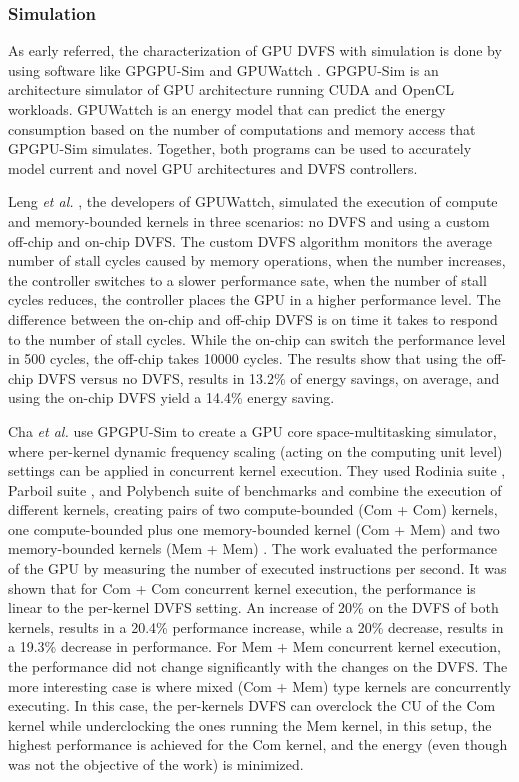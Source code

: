 \subsubsection{Simulation}

As early referred, the characterization of GPU DVFS with simulation is done by using software like GPGPU-Sim \cite{noauthor_gpgpu-sim/gpgpu-sim_distribution_2019} and GPUWattch \cite{noauthor_gpu_nodate} \cite{leng_gpuwattch:_2013}. GPGPU-Sim is an architecture simulator of GPU architecture running CUDA and OpenCL workloads. GPUWattch is an energy model that can predict the energy consumption based on the number of computations and memory access that GPGPU-Sim simulates. Together, both programs can be used to accurately model current and novel GPU architectures and DVFS controllers.

Leng \textit{et al.} \cite{leng_gpuwattch:_2013}, the developers of GPUWattch, simulated the execution of compute and memory-bounded kernels in three scenarios: no DVFS and using a custom off-chip and on-chip DVFS. The custom DVFS algorithm monitors the average number of stall cycles caused by memory operations, when the number increases, the controller switches to a slower performance sate, when the number of stall cycles reduces, the controller places the GPU in a higher performance level. The difference between the on-chip and off-chip DVFS is on time it takes to respond to the number of stall cycles. While the on-chip can switch the performance level in 500 cycles, the off-chip takes 10000 cycles. The results show that using the off-chip DVFS versus no DVFS, results in 13.2\% of energy savings, on average, and using the on-chip DVFS yield a 14.4\% energy saving.

Cha \textit{et al.} \cite{cha_core-level_2018} use GPGPU-Sim to create a GPU core space-multitasking simulator, where per-kernel dynamic frequency scaling (acting on the computing unit level) settings can be applied in concurrent kernel execution. They used Rodinia suite \cite{che_rodinia:_2009}, Parboil suite \cite{stratton_parboil:_nodate}, and Polybench suite \cite{noauthor_polybench/c_nodate} of benchmarks and combine the execution of different kernels, creating pairs of two compute-bounded (Com + Com) kernels, one compute-bounded plus one memory-bounded kernel (Com + Mem) and two memory-bounded kernels (Mem + Mem) . The work evaluated the performance of the GPU by measuring the number of executed instructions per second. It was shown that for Com + Com concurrent kernel execution, the performance is linear to the per-kernel DVFS setting. An increase of 20\% on the DVFS of both kernels, results in a 20.4\% performance increase, while a 20\% decrease, results in a 19.3\% decrease in performance. For Mem + Mem concurrent kernel execution, the performance did not change significantly with the changes on the DVFS. The more interesting case is where mixed (Com + Mem) type kernels are concurrently executing. In this case, the per-kernels DVFS can overclock the CU of the Com kernel while underclocking the ones running the Mem kernel, in this setup, the highest performance is achieved for the Com kernel, and the energy (even though was not the objective of the work) is minimized.

